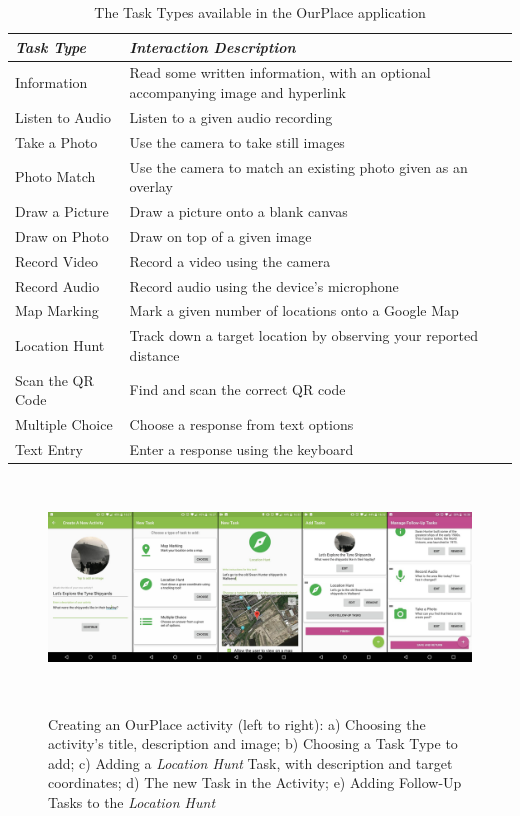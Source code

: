 \begin{table}
  \centering
  \begin{tabular}{l|p{110mm}}
    {\small\textit{Task Type}}
    & {\small \textit{Interaction Description}} \\
    \midrule
    \small Information & \small Read some written information, with an optional accompanying image and hyperlink \\
    \small Listen to Audio & \small Listen to a given audio recording \\
    \small Take a Photo & \small Use the camera to take still images \\
    \small Photo Match & \small Use the camera to match an existing photo given as an overlay \\
    \small Draw a Picture & \small Draw a picture onto a blank canvas \\
    \small Draw on Photo & \small Draw on top of a given image \\
    \small Record Video & \small Record a video using the camera \\
    \small Record Audio & \small Record audio using the device's microphone \\
    \small Map Marking & \small Mark a given number of locations onto a Google Map \\
    \small Location Hunt & \small Track down a target location by observing your reported distance \\
    \small Scan the QR Code & \small Find and scan the correct QR code \\
    \small Multiple Choice & \small Choose a response from text options \\
    \small Text Entry & \small Enter a response using the keyboard
  \end{tabular}
  \caption{The Task Types available in the OurPlace application}~\label{tab:TaskTypes}
\end{table}

\begin{figure}
  \centering
  \includegraphics[width=1\columnwidth]{images/chapter08/activityCreation}
  \caption{Creating an OurPlace activity (left to right): a) Choosing the activity's title, description and image; b) Choosing a Task Type to add; c) Adding a \textit{Location Hunt} Task, with description and target coordinates; d) The new Task in the Activity; e) Adding Follow-Up Tasks to the \textit{Location Hunt}  }~\label{fig:ActivityCreation}
\end{figure}

